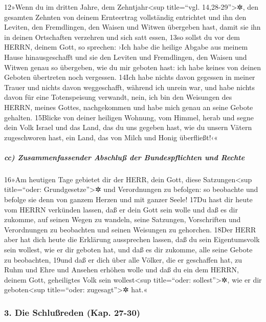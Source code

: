 12»Wenn du im dritten Jahre, dem Zehntjahr\textless sup title=``vgl.
14,28-29''\textgreater✲, den gesamten Zehnten von deinem Ernteertrag
vollständig entrichtet und ihn den Leviten, den Fremdlingen, den Waisen
und Witwen übergeben hast, damit sie ihn in deinen Ortschaften verzehren
und sich satt essen, 13so sollst du vor dem HERRN, deinem Gott, so
sprechen: ›Ich habe die heilige Abgabe aus meinem Hause hinausgeschafft
und sie den Leviten und Fremdlingen, den Waisen und Witwen genau so
übergeben, wie du mir geboten hast: ich habe keines von deinen Geboten
übertreten noch vergessen. 14Ich habe nichts davon gegessen in meiner
Trauer und nichts davon weggeschafft, während ich unrein war, und habe
nichts davon für eine Totenspeisung verwandt, nein, ich bin den
Weisungen des HERRN, meines Gottes, nachgekommen und habe mich genau an
seine Gebote gehalten. 15Blicke von deiner heiligen Wohnung, vom Himmel,
herab und segne dein Volk Israel und das Land, das du uns gegeben hast,
wie du unsern Vätern zugeschworen hast, ein Land, das von Milch und
Honig überfließt!‹«

\hypertarget{cc-zusammenfassender-abschluuxdf-der-bundespflichten-und-rechte}{%
\subparagraph{cc) Zusammenfassender Abschluß der Bundespflichten und
Rechte}\label{cc-zusammenfassender-abschluuxdf-der-bundespflichten-und-rechte}}

16»Am heutigen Tage gebietet dir der HERR, dein Gott, diese
Satzungen\textless sup title=``oder: Grundgesetze''\textgreater✲ und
Verordnungen zu befolgen: so beobachte und befolge sie denn von ganzem
Herzen und mit ganzer Seele! 17Du hast dir heute vom HERRN verkünden
lassen, daß er dein Gott sein wolle und daß es dir zukomme, auf seinen
Wegen zu wandeln, seine Satzungen, Vorschriften und Verordnungen zu
beobachten und seinen Weisungen zu gehorchen. 18Der HERR aber hat dich
heute die Erklärung aussprechen lassen, daß du sein Eigentumsvolk sein
wollest, wie er dir geboten hat, und daß es dir zukomme, alle seine
Gebote zu beobachten, 19und daß er dich über alle Völker, die er
geschaffen hat, zu Ruhm und Ehre und Ansehen erhöhen wolle und daß du
ein dem HERRN, deinem Gott, geheiligtes Volk sein wollest\textless sup
title=``oder: sollest''\textgreater✲, wie er dir geboten\textless sup
title=``oder: zugesagt''\textgreater✲ hat.«

\hypertarget{die-schluuxdfreden-kap.-27-30}{%
\subsubsection{3. Die Schlußreden (Kap.
27-30)}\label{die-schluuxdfreden-kap.-27-30}}

